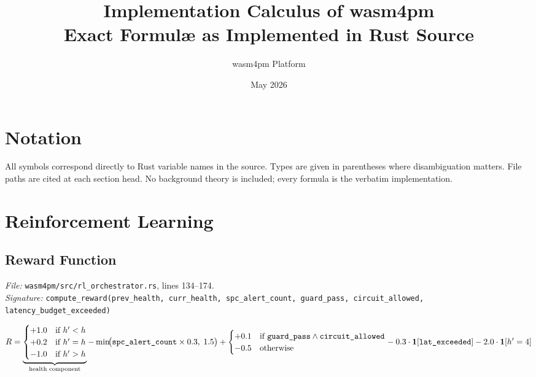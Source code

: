 \documentclass[11pt,a4paper]{article}
\title{\textbf{Implementation Calculus of wasm4pm}\\
\large Exact Formulæ as Implemented in Rust Source}
\author{wasm4pm Platform}
\date{May 2026}
\begin{document}
\maketitle
\tableofcontents
\newpage

\section*{Notation}

All symbols correspond directly to Rust variable names in the source. Types are
given in parentheses where disambiguation matters. File paths are cited at each
section head. No background theory is included; every formula is the verbatim
implementation.

\newpage

\section{Reinforcement Learning}

\subsection{Reward Function}
\textit{File:} \texttt{wasm4pm/src/rl\_orchestrator.rs}, lines 134--174.\\
\textit{Signature:} \texttt{compute\_reward(prev\_health, curr\_health, spc\_alert\_count, guard\_pass, circuit\_allowed, latency\_budget\_exceeded)}

\begin{equation}
  R =
    \underbrace{%
      \begin{cases}
        +1.0 & \text{if } h' < h \\
        +0.2 & \text{if } h' = h \\
        -1.0 & \text{if } h' > h
      \end{cases}
    }_{\text{health component}}
    - \min\!\bigl(\texttt{spc\_alert\_count}\times 0.3,\; 1.5\bigr)
    + \begin{cases}
        +0.1 & \text{if } \texttt{guard\_pass} \wedge \texttt{circuit\_allowed} \\
        -0.5 & \text{otherwise}
      \end{cases}
    - 0.3\cdot\mathbf{1}[\texttt{lat\_exceeded}]
    - 2.0\cdot\mathbf{1}[h'=4]
\end{equation}
\end{document}
